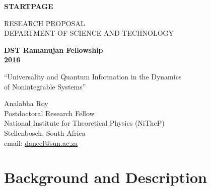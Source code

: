 \documentclass[a4paper,11pt,color]{article}
\def\Acronimo{Universality and  Quantum Information in the Dynamics\\ of Nonintegrable Systems}
\begin{document}

\phantom{a}
\vspace{15mm}
\begin{center}


        \Large{
      
     
        \textbf{STARTPAGE}
  
          \vspace{15mm}
          RESEARCH PROPOSAL\\
          DEPARTMENT OF SCIENCE AND TECHNOLOGY\\
          \vspace{1cm}
          
          \textbf{DST Ramanujan Fellowship}\\
          \textbf{2016}
          \vspace{2cm}                   

          
          \vspace{2cm}

          ``\Acronimo''
                    \vspace{2cm}

          Analabha Roy \\
          Postdoctoral Research Fellow \\
          National Institute for Theoretical Physics (NiTheP) \\
          Stellenbosch, South Africa \\
          email: \url{daneel@sun.ac.za}
        }

  \end{center}
\vspace{1cm}

\pagebreak

 
\section{Background and Description }
\label{sec:sciTecQuality}
\end{document}

